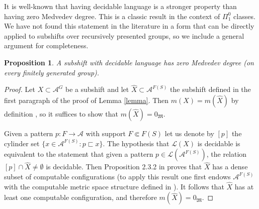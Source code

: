 \documentclass[a4paper,oneside]{amsart}
\renewcommand{\(}{\begin{dmath*}}
\renewcommand{\)}{\end{dmath*}}
\newtheorem{proposition}[theorem]{Proposition}
\theoremstyle{definition}
\newcommand{\Le}{\mathcal{L}}
\newcommand{\Lep}{\mathscr{L}}
\newcommand{\A}{\mathcal{A}}
\begin{document}
It is well-known that having decidable language is a stronger property than having zero Medvedev degree. This is a classic result in the context of $\Pi_1^0$ classes. We have not found this statement in the literature in a form that can be directly applied to subshifts over recursively presented groups, so we include a general argument for completeness. 
\begin{proposition}\label{decidable-language-implies-zero-medvedev-degree}
A subshift with decidable language has zero Medvedev degree (on every finitely generated group). 
\end{proposition}
\begin{proof}
Let $X\subset\A^G$ be a subshift and let $\hat X\subset \A^{F(S)}$ the subshift defined in the first paragraph of the proof of Lemma \ref{lemma}. Then $m(X)=m(\hat X)$ by definition \cite[\S 3]{barbieri_medvedev_2024}, so it suffices to show that $m(\hat X)=0_{\mathfrak M}$.

Given a pattern $p\colon F\to \A$ with support $F\Subset F(S)$ let us denote by $[p]$ the cylinder set $\{x\in\A^{F(S)} : p\sqsubset x\}$. The hypothesis that $\Lep(X)$ is decidable is equivalent to the statement that given a pattern $p\in\Le(\A^{F(S)})$, the relation $[p]\cap \hat X\ne\emptyset$ is decidable. Then Proposition 2.3.2 in \cite{hoyrup_genericity_2017} proves that $\hat X$ has a dense subset of computable configurations (to apply this result one first endows $\A^{F(S)}$ with the computable metric space structure defined in \cite[\S 3]{barbieri_effective_2025}). It follows that $\hat X$ has at least one computable configuration, and therefore $m(\hat X)=0_{\mathfrak M}$. 
\end{proof}
\end{document}
